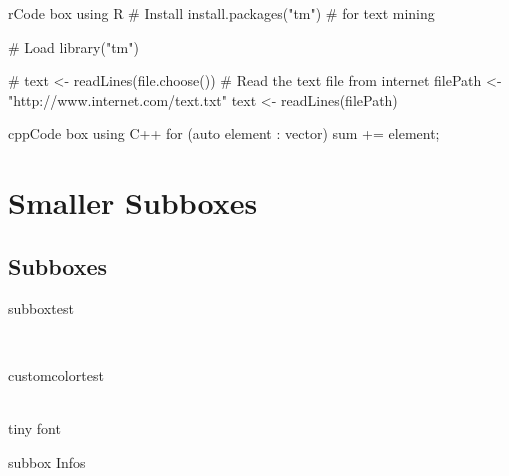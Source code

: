 \documentclass[10pt,a4paper]{article}
\begin{document}
\begin{multicols}{3}
\begin{codebox}{r}{Code box using R}
# Install
install.packages("tm")  # for text mining

# Load
library("tm")

# text <- readLines(file.choose())
# Read the text file from internet
filePath <- "http://www.internet.com/text.txt"
text <- readLines(filePath)

\end{codebox}


\begin{codebox}{cpp}{Code box using C++}
for (auto element : vector) 
{
    sum += element;
}
\end{codebox}

\newpage
\section{Smaller Subboxes}
\subsection{Subboxes}
\begin{multibox}{2} %
\begin{subbox}{subbox}{test}
\tiny


\\

\end{subbox}
\begin{subbox}{customcolor}{test}
\scriptsize


\\
\tiny
tiny font

\end{subbox}
\end{multibox}




\begin{multibox}{2} %
\begin{subbox}{subbox}{ Infos}

\\
\\


\end{subbox}
\end{multibox}
\end{multicols}
\end{document}
